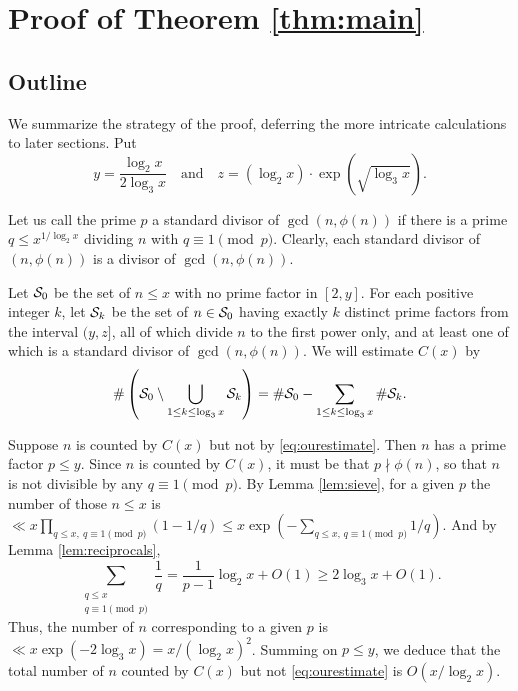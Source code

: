 \documentclass[11pt]{amsart}
\theoremstyle{remark}
\begin{document}
\section{Proof of Theorem \ref{thm:main}}
\subsection{Outline}\label{sec:outline} We summarize the strategy of the proof, deferring the more intricate calculations to later sections. Put
\[ y = \frac{\log_2 x}{2\log_3 x} \quad{\text{and}}\quad z = (\log_2 x)\cdot \exp(\sqrt{\log_3 x}). \]

Let us call the prime $p$ a \textsf{standard divisor of $\gcd(n,\phi(n))$} if there is a prime $q \le x^{1/\log_2 x}$ dividing $n$ with $q\equiv 1\pmod{p}$. Clearly, each standard divisor of $(n,\phi(n))$ is a divisor of $\gcd(n,\phi(n))$.

Let $\mathcal{S}_0$ be the set of $n\le x$ with no prime factor in $[2,y]$. For each positive integer $k$, let $\mathcal{S}_k$ be the set of $n \in \mathcal{S}_0$ having exactly $k$ distinct prime factors from the interval $(y,z]$, all of which divide $n$ to the first power only, and at least one of which is a standard divisor of $\gcd(n,\phi(n))$. We will estimate $C(x)$ by
\begin{equation}\label{eq:ourestimate} \#\left(\mathcal{S}_0\setminus \bigcup_{1\le k\le \log_3 x} \mathcal{S}_k\right) = \#\mathcal{S}_0 - \sum_{1 \le k \le \log_3 x} \#\mathcal{S}_k. \end{equation}

Suppose $n$ is counted by $C(x)$ but not by \eqref{eq:ourestimate}. Then $n$ has a prime factor $p\le y$. Since $n$ is counted by $C(x)$, it must be that $p\nmid \phi(n)$, so that $n$ is not divisible by any $q\equiv 1\pmod{p}$. By Lemma \ref{lem:sieve}, for a given $p$ the number of those $n\le x$ is $\ll x \prod_{q\le x,\ q \equiv 1\pmod{p}}(1-1/q) \le x \exp(-\sum_{q\le x,\, q\equiv 1\pmod{p}}1/q)$. And by Lemma \ref{lem:reciprocals}, $$ \sum_{\substack{q \le x\\q\equiv 1\!\!\!\!\pmod{p}}} \frac{1}{q} = \frac{1}{p-1} \log_2 x + O(1) \ge 2\log_3 x + O(1).$$ Thus, the number of $n$ corresponding to a given $p$ is $\ll x\exp(-2\log_3 x) = x/(\log_2 x)^2$. Summing on $p\le y$, we deduce that the total number of $n$ counted by $C(x)$ but not \eqref{eq:ourestimate} is $O(x/\log_2 x)$.
\end{document}
